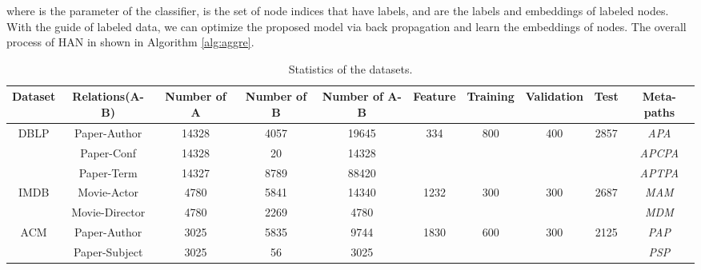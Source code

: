 where  is the parameter of the classifier,
 is the set of node indices that have labels,
 and  are the labels and embeddings of labeled nodes.
With the guide of labeled data, we can optimize the proposed model via back propagation and learn the embeddings of nodes. The overall process of HAN in shown in Algorithm \ref{alg:aggre}.
\begin{table*}[]
	\centering
	\caption{Statistics of the datasets.}
	\label{table_datasets}
	\begin{tabular}{|c|c|c|c|c|c|c|c|c|c|}
		\hline
		Dataset               & Relations(A-B) & Number of A & Number of B & Number of A-B & Feature               & Training             & Validation           & Test                  & Meta-paths \\ \hline
		\multirow{3}{*}{DBLP} & Paper-Author   & 14328       & 4057        & 19645         & \multirow{3}{*}{334}  & \multirow{3}{*}{800} & \multirow{3}{*}{400} & \multirow{3}{*}{2857} & \emph{APA}        \\ \cline{2-5} \cline{10-10} 
		& Paper-Conf     & 14328       & 20          & 14328         &                       &                      &                      &                       & \emph{APCPA}      \\ \cline{2-5} \cline{10-10} 
		& Paper-Term     & 14327       & 8789        & 88420         &                       &                      &                      &                       & \emph{APTPA}      \\ \hline
		\multirow{2}{*}{IMDB} & Movie-Actor    & 4780        & 5841        & 14340         & \multirow{2}{*}{1232} & \multirow{2}{*}{300} & \multirow{2}{*}{300} & \multirow{2}{*}{2687} & \emph{MAM}        \\ \cline{2-5} \cline{10-10} 
		& Movie-Director & 4780        & 2269        & 4780          &                       &                      &                      &                       & \emph{MDM}        \\ \hline
		\multirow{2}{*}{ACM}  & Paper-Author   & 3025        & 5835        & 9744          & \multirow{2}{*}{1830} & \multirow{2}{*}{600} & \multirow{2}{*}{300} & \multirow{2}{*}{2125} & \emph{PAP}        \\ \cline{2-5} \cline{10-10} 
		& Paper-Subject  & 3025        & 56          & 3025          &                       &                      &                      &                       & \emph{PSP}        \\ \hline
	\end{tabular}
	
\end{table*}

